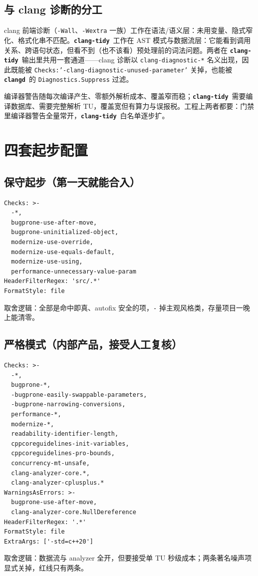\documentclass[12pt,a4paper,fontset=fandol]{ctexbook}
\newcommand{\Lib}[1]{\textbf{\texttt{#1}}}
\newcommand{\Tidy}{\Lib{clang-tidy}}
\newcommand{\CD}{\Lib{clangd}}
\begin{document}
\subsection{与 clang 诊断的分工}\label{sec:ch12-s5d}
clang 前端诊断（\texttt{-Wall}、\texttt{-Wextra} 一族）工作在语法/语义层：未用变量、隐式窄化、格式化串不匹配。\Tidy\ 工作在 AST 模式与数据流层：它能看到调用关系、跨语句状态，但看不到（也不该看）预处理前的词法问题。两者在 \Tidy\ 输出里共用一套通道——clang 诊断以 \texttt{clang-diagnostic-*} 名义出现，因此既能被 \texttt{Checks:\allowbreak '-clang-diagnostic-\allowbreak unused-parameter'} 关掉，也能被 \CD\ 的 \texttt{Diagnostics.\allowbreak Suppress} 过滤。
\begin{compare}[title={编译器警告与 \Tidy\ 检查}]
编译器警告随每次编译产生、零额外解析成本、覆盖窄而稳；\Tidy\ 需要编译数据库、需要完整解析 TU，覆盖宽但有算力与误报税。工程上两者都要：门禁里编译器警告全量常开，\Tidy\ 白名单逐步扩。
\end{compare}
\section{四套起步配置}\label{sec:ch12-s6}
\subsection{保守起步（第一天就能合入）}\label{sec:ch12-s6a}
\begin{lstlisting}[style=yamlstyle,caption={保守集：只挑几乎零误报且可自动修复的项},label={lst:ch12-cfg1}]
Checks: >-
  -*,
  bugprone-use-after-move,
  bugprone-uninitialized-object,
  modernize-use-override,
  modernize-use-equals-default,
  modernize-use-using,
  performance-unnecessary-value-param
HeaderFilterRegex: 'src/.*'
FormatStyle: file
\end{lstlisting}
取舍逻辑：全部是命中即真、autofix 安全的项，\texttt{-} 掉主观风格类，存量项目一晚上能清零。
\subsection{严格模式（内部产品，接受人工复核）}\label{sec:ch12-s6b}
\begin{lstlisting}[style=yamlstyle,caption={严格集：数据流与 analyzer 全开，红线显式化},label={lst:ch12-cfg2}]
Checks: >-
  -*,
  bugprone-*,
  -bugprone-easily-swappable-parameters,
  -bugprone-narrowing-conversions,
  performance-*,
  modernize-*,
  readability-identifier-length,
  cppcoreguidelines-init-variables,
  cppcoreguidelines-pro-bounds,
  concurrency-mt-unsafe,
  clang-analyzer-core.*,
  clang-analyzer-cplusplus.*
WarningsAsErrors: >-
  bugprone-use-after-move,
  clang-analyzer-core.NullDereference
HeaderFilterRegex: '.*'
FormatStyle: file
ExtraArgs: ['-std=c++20']
\end{lstlisting}
取舍逻辑：数据流与 analyzer 全开，但要接受单 TU 秒级成本；两条著名噪声项显式关掉，红线只有两条。
\end{document}
